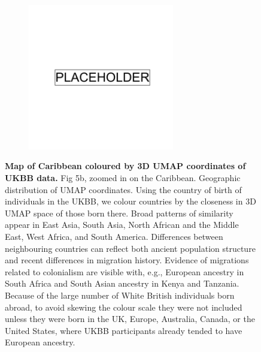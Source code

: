 \begin{figure}[ht]
    \centering
    \begin{subfigure}{\textwidth}
    \includegraphics[width=0.7\textwidth]{placeholder.png}
    \end{subfigure}
    \caption[Map of Caribbean coloured by 3D UMAP coordinates of UKBB data]{\textbf{Map of Caribbean coloured by 3D UMAP coordinates of UKBB data.} Fig 5b, zoomed in on the Caribbean. Geographic distribution of UMAP coordinates. Using the country of birth of individuals in the UKBB, we colour countries by the closeness in 3D UMAP space of those born there. Broad patterns of similarity appear in East Asia, South Asia, North African and the Middle East, West Africa, and South America. Differences between neighbouring countries can reflect both ancient population structure and recent differences in migration history. Evidence of migrations related to colonialism are visible with, e.g., European ancestry in South Africa and South Asian ancestry in Kenya and Tanzania. Because of the large number of White British individuals born abroad, to avoid skewing the colour scale they were not included unless they were born in the UK, Europe, Australia, Canada, or the United States, where UKBB participants already tended to have European ancestry.}
    \label{fig:supp_umap_ukbb_car}
\end{figure}

\newpage

